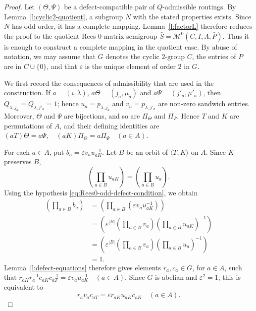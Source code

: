 \documentclass[11pt]{article}
\theoremstyle{plain}
\theoremstyle{remark}
\theoremstyle{definition}
\theoremstyle{plain}
\begin{document}
\begin{proof}
Let $(\Theta,\Psi)$ be a defect-compatible pair of $Q$-admissible routings.
By Lemma~\ref{l:cyclic2-quotient}, a subgroup $N$ with the stated properties
exists. Since $N$ has odd order, it has a complete mapping. Lemma~\ref{l:factorL}
therefore reduces the proof to the quotient Rees $0$-matrix semigroup
\(\bar S=\mathcal M^0(C,I,\Lambda,\bar P).\)
Thus it is enough to construct a complete mapping in the quotient case. By abuse of notation, we may assume that $G$ denotes the cyclic $2$-group $C$, the
entries of $P$ are in $C \cup \{0\}$, and that
$\varepsilon$ is the unique element of order $2$ in $G$.

We first record the consequences of admissibility that are used in the
construction. If $a=(i,\lambda)$, $a\Theta=(j_a,\mu_a)$ and
$a\Psi=(j'_a,\mu'_a)$, then $Q_{\lambda,j_a}=Q_{\lambda,j'_a}=1$; hence
$u_a=p_{\lambda,j_a}$ and $v_a=p_{\lambda,j'_a}$ are non-zero sandwich entries.
Moreover, $\Theta$ and $\Psi$ are bijections, and so are $\Pi_\Theta$ and
$\Pi_\Psi$. Hence $T$ and $K$ are permutations of $A$, and their defining identities are
\((aT)\Theta=a\Psi, \quad (aK)\Pi_\Theta=a\Pi_\Psi \quad (a\in A).\)

For each $a\in A$, put
\(b_a=\varepsilon v_a u_{aK}^{-1}.\)
Let $B$ be an orbit of $\langle T,K\rangle$ on $A$. Since $K$ preserves $B$,
\[
        \left(\prod_{a\in B}u_{aK}\right)=\left(\prod_{a\in B}u_a\right).
\]
Using the hypothesis \eqref{eq:Rees0-odd-defect-condition}, we obtain
\[
\begin{aligned}
        \left(\prod_{a\in B} b_a\right)
        &=\left(\prod_{a\in B}\left(\varepsilon v_a u_{aK}^{-1}\right)\right)\\
        &=\left(
        \varepsilon^{|B|}
        \left(\prod_{a\in B} v_a\right)
        \left(\prod_{a\in B}u_{aK}\right)^{-1}
        \right)\\
        &=\left(
        \varepsilon^{|B|}
        \left(\prod_{a\in B} v_a\right)
        \left(\prod_{a\in B}u_a\right)^{-1}
        \right)\\
        &=1.
\end{aligned}
\]
Lemma~\ref{l:defect-equations} therefore gives elements $r_a,c_a\in G$, for
$a\in A$, such that
\(r_{aK}r_a^{-1}c_{aK}c_{aT}^{-1} = \varepsilon v_a u_{aK}^{-1} \quad (a\in A).\)
Since $G$ is abelian and $\varepsilon^2=1$, this is equivalent to
\begin{equation}\label{eq:Rees0-odd-fill-equation}
        r_av_ac_{aT}
        =
        \varepsilon r_{aK}u_{aK}c_{aK}
        \quad (a\in A).
\end{equation}


\end{proof}
\end{document}
